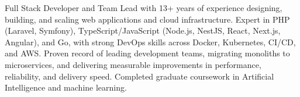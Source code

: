 

\begin{cvparagraph}

Full Stack Developer and Team Lead with 13+ years of experience designing, building, and scaling web applications and cloud infrastructure. Expert in PHP (Laravel, Symfony), TypeScript/JavaScript (Node.js, NestJS, React, Next.js, Angular), and Go, with strong DevOps skills across Docker, Kubernetes, CI/CD, and AWS. Proven record of leading development teams, migrating monoliths to microservices, and delivering measurable improvements in performance, reliability, and delivery speed. Completed graduate coursework in Artificial Intelligence and machine learning.

\end{cvparagraph}
